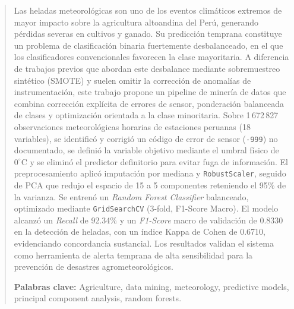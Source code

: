 \begin{abstract}
Las heladas meteorológicas son uno de los eventos climáticos extremos de mayor
impacto sobre la agricultura altoandina del Perú, generando pérdidas severas en
cultivos y ganado. Su predicción temprana constituye un problema de
clasificación binaria fuertemente desbalanceado, en el que los clasificadores
convencionales favorecen la clase mayoritaria. A diferencia de trabajos previos
que abordan este desbalance mediante sobremuestreo sintético (SMOTE) y suelen
omitir la corrección de anomalías de instrumentación, este trabajo propone un
pipeline de minería de datos que combina corrección explícita de errores de
sensor, ponderación balanceada de clases y optimización orientada a la clase
minoritaria. Sobre 1\,672\,827 observaciones meteorológicas horarias de
estaciones peruanas (18 variables), se identificó y corrigió un código de error
de sensor (\texttt{-999}) no documentado, se definió la variable objetivo
mediante el umbral físico de $0^{\circ}\text{C}$ y se eliminó el predictor
definitorio para evitar fuga de información. El preprocesamiento aplicó
imputación por mediana y \texttt{RobustScaler}, seguido de PCA que redujo el
espacio de 15 a 5 componentes reteniendo el 95\% de la varianza. Se entrenó un
\emph{Random Forest Classifier} balanceado, optimizado mediante
\texttt{GridSearchCV} (3-fold, F1-Score Macro). El modelo alcanzó un
\emph{Recall} de 92.34\% y un \emph{F1-Score} macro de validación de 0.8330 en
la detección de heladas, con un índice Kappa de Cohen de 0.6710, evidenciando
concordancia sustancial. Los resultados validan el sistema como herramienta de
alerta temprana de alta sensibilidad para la prevención de desastres
agrometeorológicos.

\vspace{0.5cm}
\noindent \textbf{Palabras clave:} 
Agriculture, data mining, meteorology, predictive models, principal component
analysis, random forests.
\end{abstract}